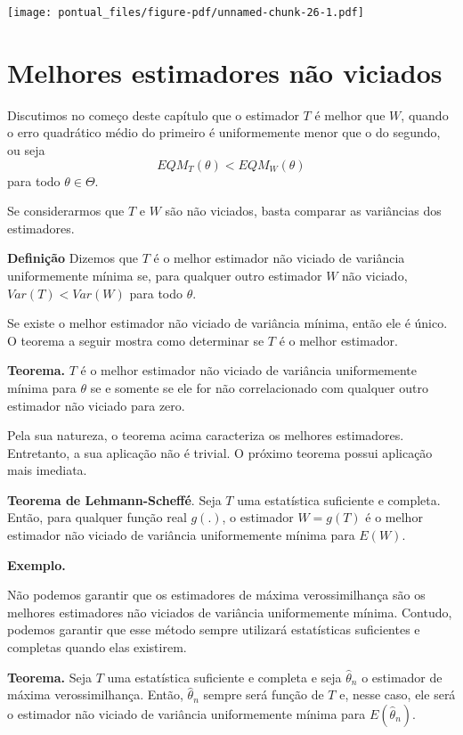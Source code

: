 \documentclass[
  letterpaper,
  DIV=11,
  numbers=noendperiod]{scrartcl}
\begin{document}
\texttt{[image: pontual\_files/figure-pdf/unnamed-chunk-26-1.pdf]}

\section{Melhores estimadores não
viciados}\label{melhores-estimadores-nuxe3o-viciados}

Discutimos no começo deste capítulo que o estimador \(T\) é melhor que
\(W\), quando o erro quadrático médio do primeiro é uniformemente menor
que o do segundo, ou seja \[EQM_T(\theta)<EQM_W(\theta)\] para todo
\(\theta\in \Theta\).

Se considerarmos que \(T\) e \(W\) são não viciados, basta comparar as
variâncias dos estimadores.

\textbf{Definição} Dizemos que \(T\) é o melhor estimador não viciado de
variância uniformemente mínima se, para qualquer outro estimador \(W\)
não viciado, \(Var(T)<Var(W)\) para todo \(\theta\).

Se existe o melhor estimador não viciado de variância mínima, então ele
é único. O teorema a seguir mostra como determinar se \(T\) é o melhor
estimador.

\textbf{Teorema.} \(T\) é o melhor estimador não viciado de variância
uniformemente mínima para \(\theta\) se e somente se ele for não
correlacionado com qualquer outro estimador não viciado para zero.

Pela sua natureza, o teorema acima caracteriza os melhores estimadores.
Entretanto, a sua aplicação não é trivial. O próximo teorema possui
aplicação mais imediata.

\textbf{Teorema de Lehmann-Scheffé}. Seja \(T\) uma estatística
suficiente e completa. Então, para qualquer função real \(g(.)\), o
estimador \(W=g(T)\) é o melhor estimador não viciado de variância
uniformemente mínima para \(E(W)\).

\textbf{Exemplo.}

Não podemos garantir que os estimadores de máxima verossimilhança são os
melhores estimadores não viciados de variância uniformemente mínima.
Contudo, podemos garantir que esse método sempre utilizará estatísticas
suficientes e completas quando elas existirem.

\textbf{Teorema.} Seja \(T\) uma estatística suficiente e completa e
seja \(\hat{\theta}_n\) o estimador de máxima verossimilhança. Então,
\(\hat{\theta}_n\) sempre será função de \(T\) e, nesse caso, ele será o
estimador não viciado de variância uniformemente mínima para
\(E(\hat{\theta}_n)\).
\end{document}
